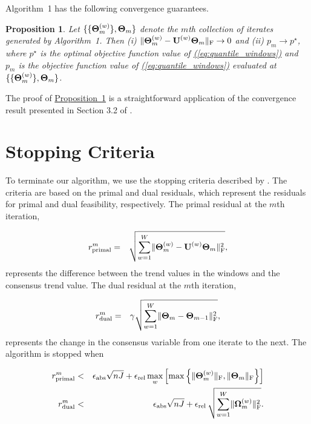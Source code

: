 \documentclass[12pt]{article}
\numberwithin{equation}{section}
\theoremstyle{plain}
\newcommand{\Eqn}[1]{\hyperref[eq:#1]{{\rm (\ref*{eq:#1})}}} %
\newcommand{\Prop}[1]{\hyperref[prop:#1]{Proposition~\ref*{prop:#1}}} %
\newcommand{\Eqn}[1]{{(\ref{eq:#1})}} %
\newcommand{\Prop}[1]{{Property~\ref{prop:#1}}} %
\newtheorem{proposition}{Proposition}[section]
\newcommand{\M}[1]{{\bm{\mathbf{\MakeUppercase{#1}}}}} %
\newcommand{\Mn}[2]{\M{#1}^{(#2)}} %
\begin{document}
Algorithm~1 has the following convergence guarantees.
\begin{proposition}
	\label{prop:convergence}
	Let $\{\{\Mn{\Theta}{w}_m\}, \M{\Theta}_m\}$ denote the $m$th collection of iterates generated by Algorithm~1. Then (i)
	$\lVert \Mn{\Theta}{w}_m - \Mn{U}{w}\M{\Theta}_m \rVert_{\text{F}} \rightarrow 0$ and (ii) $p_m \rightarrow p^\star$, where $p^\star$ is the optimal objective function value of
	\Eqn{quantile_windows} and $p_m$ is the objective function value of \Eqn{quantile_windows} evaluated at $\{\{\Mn{\Theta}{w}_m\}, \M{\Theta}_m\}$.
\end{proposition}
The proof of \Prop{convergence} is a straightforward application of the convergence result presented in Section 3.2 of \cite{boyd2011distributed}.

\section{Stopping Criteria}

To terminate our algorithm, we use the stopping criteria described by \cite{boyd2011distributed}. The criteria are based on the primal and dual residuals, which represent the residuals for primal and dual feasibility, respectively. The primal residual at the $m$th iteration,

\begin{eqnarray*}
	r_{\text{primal}}^{m} & = & \sqrt{\sum_{w=1}^W\lVert\Mn{\Theta}{w}_{m} - \Mn{U}{w}\M{\Theta}_m\rVert_{\text{F}}^2},
\end{eqnarray*}
represents the difference between the trend values in the windows and the consensus trend value. The dual residual at the $m$th iteration,

\begin{eqnarray*}
	r_{\text{dual}}^{m} & = & \gamma\sqrt{\sum_{w=1}^W \lVert\M{\Theta}_m - \M{\Theta}_{m-1}\rVert_{\text{F}}^2},
\end{eqnarray*}
represents the change in the consensus variable from one iterate to the next. The algorithm is stopped when

\begin{eqnarray}
	r_{\text{primal}}^{m} & < &\epsilon_{\text{abs}}\sqrt{nJ} + \epsilon_{\text{rel}}\,\underset{w}{\max} \left[\max
	\left\{\lVert\Mn{\Theta}{w}_m \rVert_{\text{F}}, \lVert \M{\Theta}_{m} \rVert_{\text{F}} \right\}\right] \nonumber \\%
	r_{\text{dual}}^{m} & < & \epsilon_{\text{abs}}\sqrt{nJ} + \epsilon_{\text{rel}}\,\sqrt{\sum_{w=1}^W
		\lVert \Mn{\Omega}{w}_m \rVert_{\text{F}}^2}.
\label{eq:stopping}
\end{eqnarray}
\end{document}
